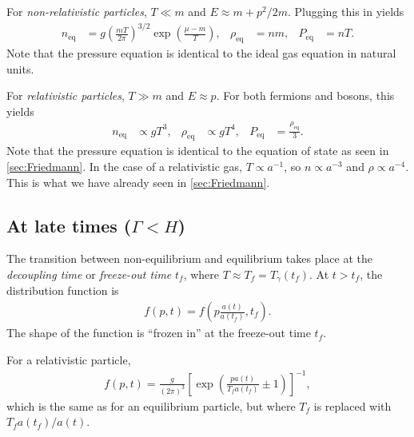 For \emph{non-relativistic particles}, $T \ll m$ and $E \approx m + p^2/2m$. Plugging this in yields
\begin{align*}
	n_\text{eq} &= g \left( \frac{m T}{2 \pi} \right)^{3/2} \exp\left( \frac{\mu-m}{T} \right),&
	\rho_\text{eq} &= n m,&
	P_\text{eq} &= n T.
\end{align*}
Note that the pressure equation is identical to the ideal gas equation in natural units. 

For \emph{relativistic particles}, $T \gg m$ and $E \approx p$. For both fermions and bosons, this yields
\begin{align*}
	n_\text{eq} &\propto g T^3,&
	\rho_\text{eq} &\propto g T^4,&
	P_\text{eq} &= \frac{\rho_\text{eq}}{3}.
\end{align*}
Note that the pressure equation is identical to the equation of state as seen in \cref{sec:Friedmann}.
In the case of a relativistic gas, $T \propto a^{-1}$, so $n \propto a^{-3}$ and $\rho \propto a^{-4}$. This is what we have already seen in \cref{sec:Friedmann}.




\subsection{At late times ($\Gamma < H$)}
\label{ssec:late-times}
The transition between non-equilibrium and equilibrium takes place at the \emph{decoupling time} or \emph{freeze-out time} $t_f$, where $T \approx T_f = T_{\gamma}(t_f)$. At $t>t_f$, the distribution function is
\begin{align*}
	f(p,t) = f\left( p \frac{a(t)}{a(t_f)}, t_f \right).
\end{align*}
The shape of the function is \enquote{frozen in} at the freeze-out time $t_f$.

For a relativistic particle,
\begin{align*}
	f(p,t) =
	 \frac{g}{(2\pi)^3} \left[ \exp\left( 
		\frac{p a(t)}{T_f a(t_f)} \pm 1
	 	\right) \right]^{-1},
\end{align*}
which is the same as for an equilibrium particle, but where $T_f$ is replaced with $T_f a(t_f)/a(t)$.



